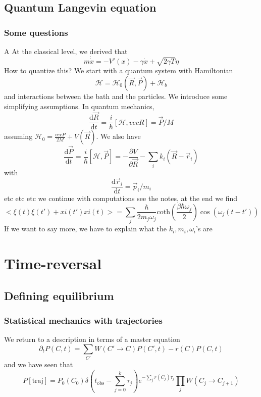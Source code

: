 \documentclass[a4paper]{book}
\theoremstyle{definition}
\theoremstyle{remark}
\begin{document}
\section{Quantum Langevin equation}

\subsection{Some questions}A
At the classical level, we derived that 
\begin{equation}
    m\dot{\dot{x}} = -V'(x) - \gamma \dot{x} + \sqrt{2\gamma T}\eta
\end{equation}
How to quantize this? We start with a quantum system with Hamiltonian 
\begin{equation}
    \mathcal{H} = \mathcal{H}_0(\vec{R}, \vec{P}) + \mathcal{H}_b 
\end{equation}
and interactions between the bath and the particles. We introduce some simplifying assumptions. In quantum mechanics, 
\begin{equation}
    \frac{\text{d}\vec{R}}{\text{d}t} = \frac{i}{\hbar}[\mathcal{H}, vec{R}] = \vec{P}/M
\end{equation}
assuming $\mathcal{H}_0 = \frac{vec{P}}{2M} + V(\vec{R})$. We also have 
\begin{equation}
    \frac{\text{d}\vec{P}}{\text{d}t} = \frac{i}{\hbar}[\mathcal{H}, \vec{P}] = -\frac{\partial V}{\partial \vec{R}} - \sum_i k_i(\vec{R} - \vec{r}_i)
\end{equation}
with 
\begin{equation}
    \frac{\text{d}\vec{r}_i}{\text{d}t} = \vec{p}_i/m_i
\end{equation}
etc etc etc we continue with computations see the notes, at the end we find 
\begin{equation}
    <\xi(t)\xi(t') + xi(t')xi(t)> = \sum_j \frac{\hbar}{2m_j \omega_j} \text{coth}(\frac{\beta \hbar \omega_j}{2})\cos (\omega_j(t-t'))
\end{equation}
If we want to say more, we have to explain what the $k_i, m_i, \omega_i$'s are
\chapter{Time-reversal}

\section{Defining equilibrium}
\subsection{Statistical mechanics with trajectories}
We return to a description in terms of a master equation 
\begin{equation}
    \partial_t P(C, t) = \sum_{C'} W(C' \rightarrow C)P(C', t) - r(C)P(C, t)
\end{equation}
and we have seen that 
\begin{equation}
    P[\text{traj}] = P_0(C_0) \delta(t_{\text{obs}} - \sum_{j=0}^k \tau_j) e^{-\sum_j r(C_j)\tau_j}\prod_j W(C_j \rightarrow C_{j+1})
\end{equation}
\end{document}
